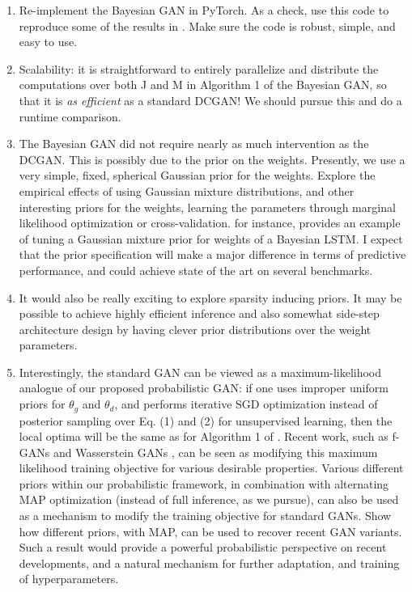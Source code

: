 \documentclass[11pt]{article}
\begin{document}
\begin{enumerate}
\item Re-implement the Bayesian GAN in PyTorch.  As a check, use this code to reproduce some of the results in \citet{saatchiwilson2017}.  Make sure the code is robust, simple, and easy to use.
\item Scalability: it is straightforward to entirely parallelize and distribute the computations over both J and M in Algorithm 1 of the Bayesian GAN, so that it is \emph{as efficient} as a standard DCGAN!  We should pursue this and do a runtime comparison.
\item The Bayesian GAN did not require nearly as much intervention as the DCGAN. This is possibly due to the prior on the weights.  Presently, we use a very simple, fixed, spherical Gaussian prior for the weights.  Explore the empirical effects of using Gaussian mixture distributions, and  other interesting priors for the weights, learning the parameters through marginal likelihood optimization or cross-validation.  \citet{fortunato2017bayesian} for instance, provides an example of tuning a Gaussian mixture prior for weights of a Bayesian LSTM.  I expect that the prior specification will make a major difference in terms of predictive performance, and could achieve state of the art on several benchmarks.  
\item It would also be really exciting to explore sparsity inducing priors.  It may be possible to achieve highly efficient inference and also somewhat side-step architecture design by having clever prior distributions over the weight parameters.
\item Interestingly, the standard GAN can be viewed as a maximum-likelihood analogue of our proposed probabilistic GAN: if one uses improper uniform priors for $\theta_g$ and $\theta_d$, and performs iterative SGD optimization instead of posterior sampling over Eq. (1) and (2) for unsupervised learning, then the local optima will be the same as for Algorithm 1 of \citep{goodfellow2014generative}.  Recent work, such as f-GANs \citep{nowozin2016} and Wasserstein GANs \citep{arjovsky2017wasserstein}, can be seen as modifying this maximum likelihood training objective for various desirable properties.  Various different priors within our probabilistic framework, in combination with alternating MAP optimization (instead of full inference, as we pursue), can also be used as a mechanism to modify the training objective for standard GANs.  Show how different priors, with MAP, can be used to recover recent GAN variants.  Such a result would provide a powerful probabilistic perspective on recent developments, and a natural mechanism for further adaptation, and training of hyperparameters.

\end{enumerate}
\end{document}

